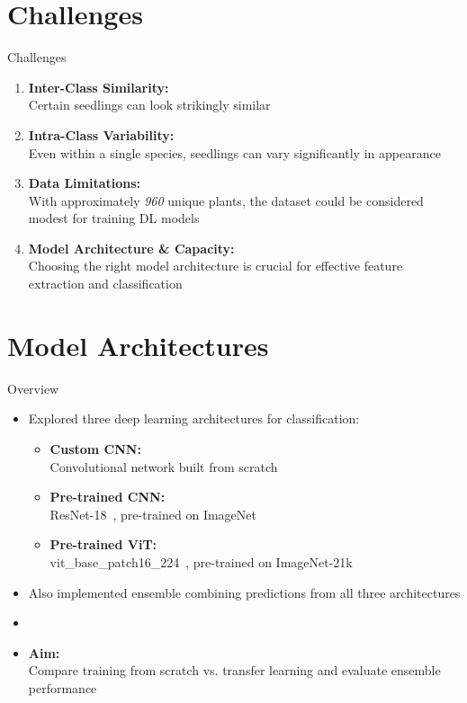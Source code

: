 \documentclass{beamer}
\begin{document}
\section{Challenges}
\begin{frame}{Challenges}
    \begin{enumerate}
        \item \textbf{Inter-Class Similarity:\\}Certain seedlings can look strikingly similar
        \item \textbf{Intra-Class Variability:\\}Even within a single species, seedlings can vary significantly in appearance
        \item \textbf{Data Limitations:\\}With approximately \textit{960} unique plants, the dataset could be considered modest for training DL models
        \item \textbf{Model Architecture \& Capacity:\\}Choosing the right model architecture is crucial for effective feature extraction and classification
    \end{enumerate}
\end{frame}

\section{Model Architectures}
\begin{frame}{Overview}
    \begin{itemize}
        \item Explored three deep learning architectures for classification:
              \begin{itemize}
                  \item \textbf{Custom CNN:\\}Convolutional network built from scratch
                  \item \textbf{Pre-trained CNN:\\}ResNet-18~\cite{DBLP:journals/corr/HeZRS15}, pre-trained on ImageNet~\cite{5206848ImageNet}
                  \item \textbf{Pre-trained ViT:\\}vit\_base\_patch16\_224~\cite{Wightman_PyTorch_Image_Models}, pre-trained on ImageNet-21k~\cite{ridnik2021imagenet}
              \end{itemize}
        \item Also implemented ensemble combining predictions from all three architectures
        \item[] \vspace{0.5cm}
        \item \textbf{Aim:\\}Compare training from scratch vs. transfer learning and evaluate ensemble performance
    \end{itemize}
\end{frame}
\end{document}

